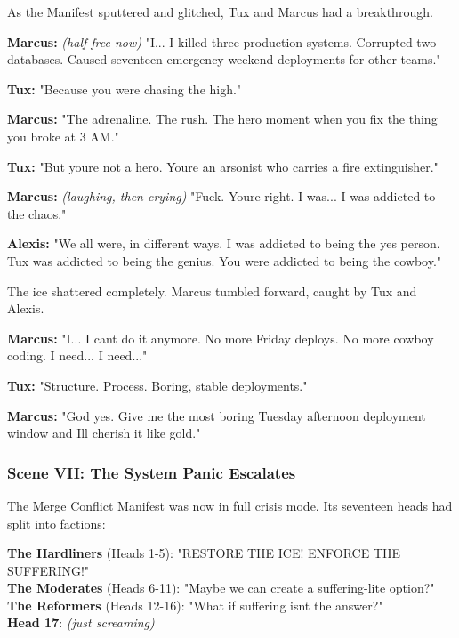 As the Manifest sputtered and glitched, Tux and Marcus had a breakthrough.

\textbf{Marcus:} \emph{(half free now)} "I... I killed three production systems. Corrupted two databases. Caused seventeen emergency weekend deployments for other teams."

\textbf{Tux:} "Because you were chasing the high."

\textbf{Marcus:} "The adrenaline. The rush. The \textquotesingle hero\textquotesingle{} moment when you fix the thing you broke at 3 AM."

\textbf{Tux:} "But you\textquotesingle re not a hero. You\textquotesingle re an arsonist who carries a fire extinguisher."

\textbf{Marcus:} \emph{(laughing, then crying)} "Fuck. You\textquotesingle re right. I was... I was addicted to the chaos."

\textbf{Alexis:} "We all were, in different ways. I was addicted to being the \textquotesingle yes\textquotesingle{} person. Tux was addicted to being the genius. You were addicted to being the cowboy."

The ice shattered completely. Marcus tumbled forward, caught by Tux and Alexis.

\textbf{Marcus:} "I... I can\textquotesingle t do it anymore. No more Friday deploys. No more cowboy coding. I need... I need..."

\textbf{Tux:} "Structure. Process. Boring, stable deployments."

\textbf{Marcus:} "God yes. Give me the most boring Tuesday afternoon deployment window and I\textquotesingle ll cherish it like gold."

\bookdivider

\subsubsection{Scene VII: The System Panic Escalates}\label{scene-vii-the-system-panic-escalates}

The Merge Conflict Manifest was now in full crisis mode. Its seventeen heads had split into factions:

\textbf{The Hardliners} (Heads 1-5): "RESTORE THE ICE! ENFORCE THE SUFFERING!"\\
\textbf{The Moderates} (Heads 6-11): "Maybe we can create a suffering-lite option?"\\
\textbf{The Reformers} (Heads 12-16): "What if suffering isn\textquotesingle t the answer?"\\
\textbf{Head 17}: \emph{(just screaming)}


